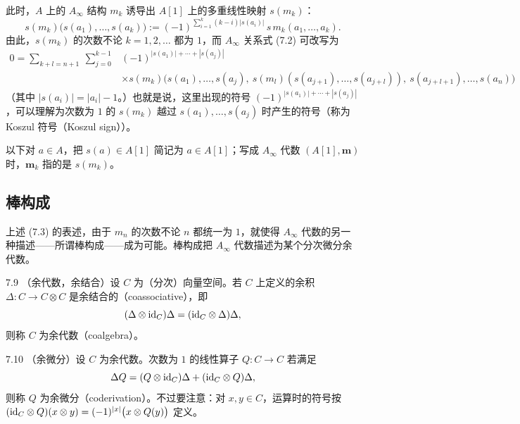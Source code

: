 此时，$A$ 上的 $A_\infty$ 结构 $m_{k}$ 诱导出 $A[1]$ 上的多重线性映射 $s(m_{k})$：
\[
  s(m_{k})\bigl(s(a_{1}),\dots,s(a_{k})\bigr):=(-1)^{\sum_{i=1}^{k}(k-i)|s(a_{i})|}\,s\,m_{k}(a_{1},\dots,a_{k}).
\]
由此，$s(m_{k})$ 的次数不论 $k=1,2,\dots$ 都为 $1$，而 $A_\infty$ 关系式 (7.2) 可改写为
\begin{equation}
\begin{aligned}
  0=\sum_{k+l=n+1}\ \sum_{j=0}^{k-1}&(-1)^{|s(a_{1})|+\cdots+|s(a_{j})|}\\
  &\times s(m_{k})\bigl(s(a_{1}),\dots,s(a_{j}),\ s(m_{l})(s(a_{j+1}),\dots,s(a_{j+l})),\ s(a_{j+l+1}),\dots,s(a_{n})\bigr)
\end{aligned}
\tag{7.3}
\end{equation}
（其中 $|s(a_{i})|=|a_{i}|-1$。）也就是说，这里出现的符号 $(-1)^{|s(a_{1})|+\cdots+|s(a_{j})|}$，可以理解为次数为 $1$ 的 $s(m_{k})$ 越过 $s(a_{1}),\dots,s(a_{j})$ 时产生的符号（称为 Koszul 符号（Koszul sign））。

以下对 $a\in A$，把 $s(a)\in A[1]$ 简记为 $a\in A[1]$；写成 $A_\infty$ 代数 $(A[1],\mathbf m)$ 时，$\mathbf m_{k}$ 指的是 $s(m_{k})$。


\subsection{棒构成}

上述 (7.3) 的表述，由于 $m_{n}$ 的次数不论 $n$ 都统一为 $1$，就使得 $A_\infty$ 代数的另一种描述——所谓棒构成——成为可能。棒构成把 $A_\infty$ 代数描述为某个分次微分余代数。

\begin{definition}{7.9}
（余代数，余结合）设 $C$ 为（分次）向量空间。若 $C$ 上定义的余积 $\Delta\colon C\to C\otimes C$ 是余结合的（coassociative），即
\[
  (\Delta\otimes\mathrm{id}_{C})\Delta=(\mathrm{id}_{C}\otimes\Delta)\Delta,
\]
则称 $C$ 为余代数（coalgebra）。
\end{definition}

\begin{definition}{7.10}
（余微分）设 $C$ 为余代数。次数为 $1$ 的线性算子 $Q\colon C\to C$ 若满足
\[
  \Delta Q=(Q\otimes\mathrm{id}_{C})\Delta+(\mathrm{id}_{C}\otimes Q)\Delta,
\]
则称 $Q$ 为余微分（coderivation）。不过要注意：对 $x,y\in C$，运算时的符号按 $(\mathrm{id}_{C}\otimes Q)(x\otimes y)=(-1)^{|x|}\bigl(x\otimes Q(y)\bigr)$ 定义。
\end{definition}

